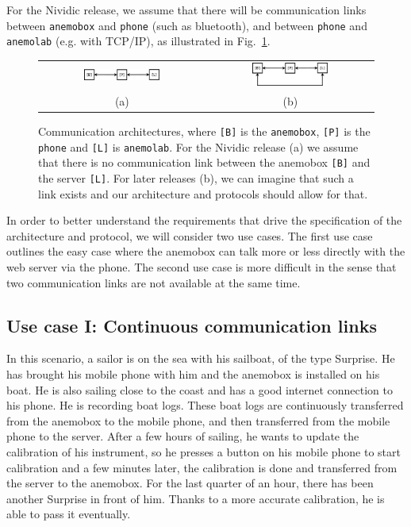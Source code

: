 \documentclass{article}
\newcommand{\device}[1]{\texttt{#1}}
\newcommand{\anemobox}{\device{anemobox}}
\newcommand{\phone}{\device{phone}}
\newcommand{\anemolab}{\texttt{anemolab}}
\newcommand{\abbrbox}{\device{[B]}}
\newcommand{\abbrphone}{\device{[P]}}
\newcommand{\abbrlab}{\device{[L]}}
\begin{document}
For the Nividic release, we assume that there will be communication links between \anemobox{} and \phone{} (such as bluetooth), and between \phone{} and \anemolab{} (e.g. with TCP/IP), as illustrated in Fig.~\ref{fig:arch}.
\begin{figure}
\begin{tabular}{cc}
\includegraphics[width=0.48\textwidth]{archnividic.eps} & \includegraphics[width=0.48\textwidth]{archlater.eps} \\
(a) & (b)
\end{tabular}
\caption{Communication architectures, where \abbrbox{} is the \anemobox{}, \abbrphone{} is the \phone{} and \abbrlab{} is \anemolab{}. For the Nividic release (a) we assume that there is no communication link between the anemobox \abbrbox{} and the server \abbrlab{}. For later releases (b), we can imagine that such a link exists and our architecture and protocols should allow for that.}
\label{fig:arch}
\end{figure}

In order to better understand the requirements that drive the specification of the architecture and protocol, we will consider two use cases. The first use case outlines the easy case where the anemobox can talk more or less directly with the web server via the phone. The second use case is more difficult in the sense that two communication links are not available at the same time.

\subsection{Use case I: Continuous communication links}
\label{sec:easycase}
In this scenario, a sailor is on the sea with his sailboat, of the type Surprise. He has brought his mobile phone with him and the anemobox is installed on his boat. He is also sailing close to the coast and has a good internet connection to his phone. He is recording boat logs. These boat logs are continuously transferred from the anemobox to the mobile phone, and then transferred from the mobile phone to the server. After a few hours of sailing, he wants to update the calibration of his instrument, so he presses a button on his mobile phone to start calibration and a few minutes later, the calibration is done and transferred from the server to the anemobox. For the last quarter of an hour, there has been another Surprise in front of him. Thanks to a more accurate calibration, he is able to pass it eventually.
\end{document}
